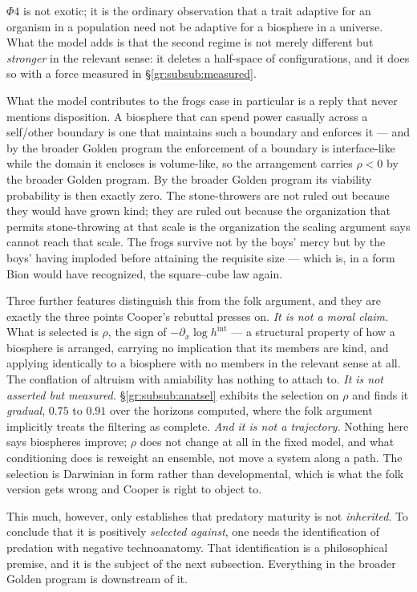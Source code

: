 $\Phi4$ is not exotic; it is the ordinary observation that a trait
adaptive for an organism in a population need not be adaptive for a
biosphere in a universe. What the model adds is that the second regime
is not merely different but \emph{stronger} in the relevant sense: it
deletes a half-space of configurations, and it does so with a force
measured in \S\ref{gr:subsub:measured}.

What the model contributes to the frogs case in particular is a reply
that never mentions disposition. A biosphere that can spend power
casually across a self/other boundary is one that maintains such a
boundary and enforces it --- and by the broader Golden program the
enforcement of a boundary is interface-like while the domain it encloses
is volume-like, so the arrangement carries $\rho<0$ by
the broader Golden program. By the broader Golden program its
viability probability is then exactly zero. The stone-throwers are not
ruled out because they would have grown kind; they are ruled out
because the organization that permits stone-throwing at that scale is
the organization the scaling argument says cannot reach that scale. The
frogs survive not by the boys' mercy but by the boys' having imploded
before attaining the requisite size --- which is, in a form Bion would
have recognized, the square--cube law again.

Three further features distinguish this from the folk argument, and they
are exactly the three points Cooper's rebuttal presses on. \emph{It is not
a moral claim.} What is selected is $\rho$, the sign of
$-\partial_x\log h^{\mathrm{int}}$ --- a structural property of how a
biosphere is arranged, carrying no implication that its members are
kind, and applying identically to a biosphere with no members in the
relevant sense at all. The conflation of altruism with amiability has
nothing to attach to. \emph{It is not asserted but measured.}
\S\ref{gr:subsub:anatsel} exhibits the selection on $\rho$ and finds it
\emph{gradual}, $0.75$ to $0.91$ over the horizons computed, where the folk argument implicitly treats the filtering as complete.
\emph{And it is not a trajectory.} Nothing here says biospheres improve;
$\rho$ does not change at all in the fixed model, and what conditioning
does is reweight an ensemble, not move a system along a path. The
selection is Darwinian in form rather than developmental, which is
what the folk version gets wrong and Cooper is right to object to.

This much, however, only establishes that predatory maturity is not
\emph{inherited}. To conclude that it is positively \emph{selected
against}, one needs the identification of predation with negative
technoanatomy. That identification is a philosophical premise, and it is
the subject of the next subsection. Everything in
the broader Golden program is downstream of it.

